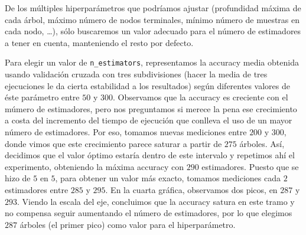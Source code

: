 \documentclass[a4]{article}
\begin{document}
De los múltiples hiperparámetros que podríamos ajustar (profundidad
máxima de cada árbol, máximo número de nodos terminales, mínimo número
de muestras en cada nodo, \ldots), sólo buscaremos un valor adecuado
para el número de estimadores a tener en cuenta, manteniendo el resto
por defecto.

Para elegir un valor de \texttt{n\_estimators}, representamos la
accuracy media obtenida usando validación cruzada con tres
subdivisiones (hacer la media de tres ejecuciones le da cierta
estabilidad a los resultados) según diferentes valores de éste
parámetro entre $50$ y $300$. Observamos que la accuracy es
creciente con el múmero de estimadores, pero nos preguntamos si merece
la pena ese crecimiento a costa del incremento del tiempo de ejecución
que conlleva el uso de un mayor número de estimadores. Por eso,
tomamos nuevas mediciones entre $200$ y $300$, donde vimos que este
crecimiento parece saturar a partir de $275$ árboles. Así, decidimos
que el valor óptimo estaría dentro de este intervalo y repetimos ahí
el experimento, obteniendo la máxima accuracy con $290$
estimadores. Puesto que se hizo de $5$ en $5$, para obtener un valor
más exacto, tomamos mediciones cada $2$ estimadores entre $285$ y
$295$. En la cuarta gráfica, observamos dos picos, en $287$ y
$293$. Viendo la escala del eje, concluimos que la accuracy
satura en este tramo y no compensa seguir aumentando el número de
estimadores, por lo que elegimos $287$ árboles (el primer pico) como valor para el hiperparámetro.
\end{document}
